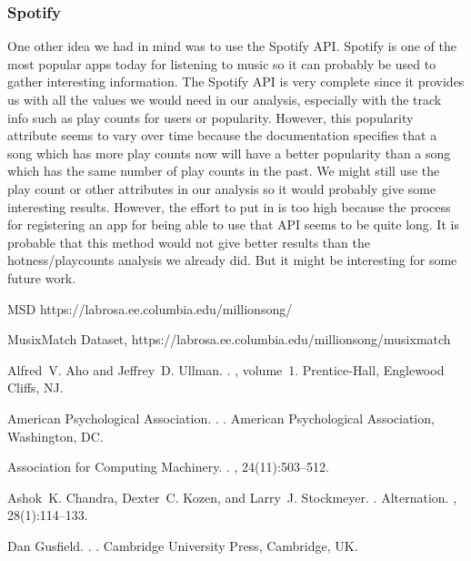 \documentclass[11pt]{article}
\begin{document}
\subsubsection{Spotify}
One other idea we had in mind was to use the Spotify API. Spotify is one of the most
popular apps today for listening to music so it can probably be used to gather interesting information. The
Spotify API is very complete since it provides us with all the values we would need in our analysis,
especially with the track info such as play counts for users or popularity. However, this popularity
attribute seems to vary over time because the documentation specifies that a song which has more play
counts now will have a better popularity than a song which has the same number of play counts in the
past. We might still use the play count or other attributes in our analysis so it would probably give some
interesting results. However, the effort to put in is too high because the process for registering an app for
being able to use that API seems to be quite long. It is probable that this method would not give better
results than the hotness/playcounts analysis we already did. But it might be interesting for some future
work.

\begin{thebibliography}{}

  
\newblock MSD
\newblock https://labrosa.ee.columbia.edu/millionsong/

MusixMatch Dataset, https://labrosa.ee.columbia.edu/millionsong/musixmatch

Alfred~V. Aho and Jeffrey~D. Ullman.
.
, volume~1.
\newblock Prentice-{Hall}, Englewood Cliffs, NJ.

{American Psychological Association}.
.
.
\newblock American Psychological Association, Washington, DC.

{Association for Computing Machinery}.
.
, 24(11):503--512.

Ashok~K. Chandra, Dexter~C. Kozen, and Larry~J. Stockmeyer.
.
\newblock Alternation.
,
  28(1):114--133.

Dan Gusfield.
.
.
\newblock Cambridge University Press, Cambridge, UK.

\end{thebibliography}
\end{document}
